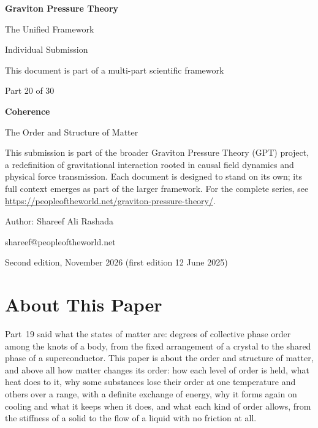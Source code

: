 \documentclass[11pt,a4paper]{article}
\begin{document}
\renewcommand{\thetable}{20.\arabic{table}}
\begin{titlepage}
\centering
\vspace*{1.5cm}
{\Huge\bfseries Graviton Pressure Theory\par}
\vspace{0.4cm}
{\Large The Unified Framework\par}
{\large Individual Submission\par}
\vspace{0.3cm}
{\normalsize This document is part of a multi-part scientific framework\par}
\vspace{1.6cm}
{\large Part 20 of 30\par}
\vspace{0.6cm}
{\huge\bfseries Coherence\par}
\vspace{0.5cm}
{\Large The Order and Structure of Matter\par}
\vspace{1.4cm}
\begin{minipage}{0.82\textwidth}\centering\small
This submission is part of the broader Graviton Pressure Theory (GPT) project, a redefinition of gravitational interaction rooted in causal field dynamics and physical force transmission. Each document is designed to stand on its own; its full context emerges as part of the larger framework. For the complete series, see \url{https://peopleoftheworld.net/graviton-pressure-theory/}.
\end{minipage}
\vfill
{\large Author: Shareef Ali Rashada\par}
{\normalsize shareef@peopleoftheworld.net\par}
\vspace{0.3cm}
{\normalsize Second edition, November 2026 \quad (first edition 12 June 2025)\par}
\end{titlepage}

\tableofcontents
\newpage

\section*{About This Paper}

Part~19 said what the states of matter are: degrees of collective phase order among the knots of a body, from the fixed arrangement of a crystal to the shared phase of a superconductor. This paper is about the order and structure of matter, and above all how matter changes its order: how each level of order is held, what heat does to it, why some substances lose their order at one temperature and others over a range, with a definite exchange of energy, why it forms again on cooling and what it keeps when it does, and what each kind of order allows, from the stiffness of a solid to the flow of a liquid with no friction at all.
\end{document}
